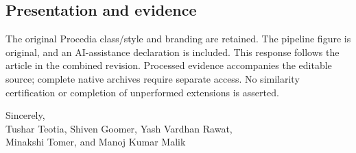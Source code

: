 \subsection*{Presentation and evidence}
The original Procedia class/style and branding are retained. The pipeline figure is original, and an AI-assistance declaration is included. This response follows the article in the combined revision. Processed evidence accompanies the editable source; complete native archives require separate access. No similarity certification or completion of unperformed extensions is asserted.

\medskip
\noindent Sincerely,\\
Tushar Teotia, Shiven Goomer, Yash Vardhan Rawat,\\
Minakshi Tomer, and Manoj Kumar Malik
